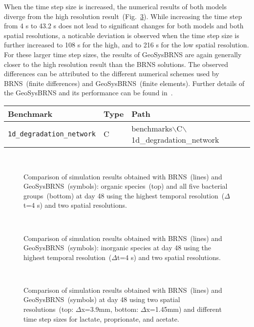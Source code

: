 When the time step size is increased, the numerical results of both models
diverge from the high resolution result~(Fig.~\ref{fig:columnresults}).  While
increasing the time step from 4 s to 43.2 s does not lead to significant
changes for both models and both spatial resolutions, a noticable deviation is
observed when the time step size is further increased to 108 s for the high,
and to 216 s for the low spatial resolution.  For these larger time step sizes,
the results of GeoSysBRNS are again generally closer to the high resolution
result than the BRNS solutions.  The observed differences can be attributed to
the different numerical schemes used by BRNS~(finite differences) and
GeoSysBRNS~(finite elements). Further details of the GeoSysBRNS and its
performance can be found in~\cite{Centler2009}.


\begin{table}[h!]
\centering
\begin{tabular}{|l|l|l|}
\hline
Benchmark & Type & Path \\
\hline
\texttt{1d\_degradation\_network}& C & benchmarks$\backslash$C$\backslash$1d\_degradation\_network \\
\hline
\end{tabular}
\end{table}

\begin{figure}[h!]
\centering
{}\\
\caption{
Comparison of simulation results obtained with BRNS~(lines) and
GeoSysBRNS~(symbols): organic species~(top) and all five bacterial
groups~(bottom) at day 48 using the highest temporal resolution~($\Delta$t=4 s)
and two spatial resolutions. 
}
\label{fig:columnresultsfine1}
\end{figure}

\begin{figure}[h!]
\centering
{}\\
\caption{
Comparison of simulation results obtained with BRNS~(lines) and
GeoSysBRNS~(symbols): inorganic species at day 48 using the highest temporal
resolution~($\Delta$t=4 s) and two spatial resolutions. 
}
\label{fig:columnresultsfine2}
\end{figure}

\begin{figure}[h!]
\centering
{}\\
\caption{
Comparison of simulation results obtained with BRNS~(lines) and
GeoSysBRNS~(symbols) at day 48 using two spatial resolutions~(top:
$\Delta$x=3.9mm, bottom: $\Delta$x=1.45mm) and different time step sizes for
lactate, proprionate, and acetate.
}
\label{fig:columnresults}
\end{figure}

\clearpage
